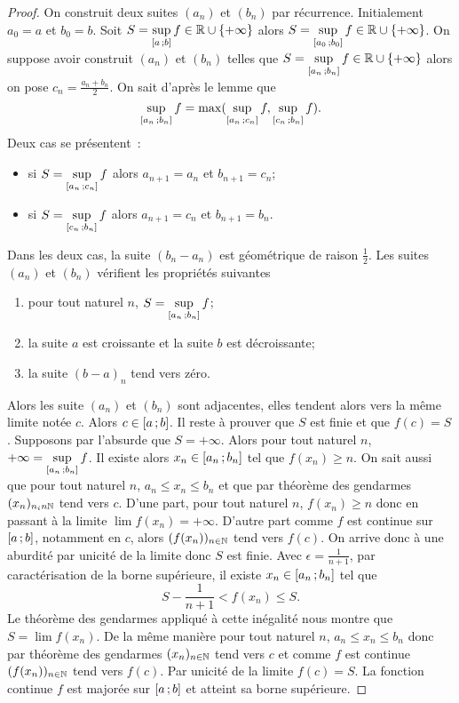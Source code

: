 \begin{proof}
  On construit deux suites $(a_n)$ et $(b_n)$ par récurrence. Initialement $a_0=a$ et $b_0=b$. Soit $S=\sup\limits_{\left[ a \, ;  b \right]}f \in \mathbb{R}\cup\{+\infty\}$ alors $S=\sup\limits_{\left[ a_0 \, ;  b_0 \right]}f \in \mathbb{R}\cup\{+\infty\}$. On suppose avoir construit $(a_n)$ et $(b_n)$ telles que $S=\sup\limits_{\left[ a_n \, ;  b_n \right]}f \in \mathbb{R}\cup\{+\infty\}$ alors on pose $c_n=\frac{a_n+b_n}{2}$. On sait d'après le lemme que 
  \begin{equation}
    \sup\limits_{\left[ a_n \, ;  b_n \right]}f=\max(\sup\limits_{\left[ a_n \, ;  c_n \right]}f,\sup\limits_{\left[ c_n \, ;  b_n \right]}f).
  \end{equation}
  Deux cas se présentent~:
  \begin{itemize}
  \item si $S=\sup\limits_{\left[ a_n \, ;  c_n \right]}f$ alors $a_{n+1}=a_n$ et $b_{n+1}=c_n$;
  \item si $S=\sup\limits_{\left[ c_n \, ;  b_n \right]}f$ alors $a_{n+1}=c_n$ et $b_{n+1}=b_n$.
  \end{itemize}
  Dans les deux cas, la suite $(b_n-a_n)$ est géométrique de raison $\frac{1}{2}$. Les suites $(a_n)$ et $(b_n)$ vérifient les propriétés suivantes
  \begin{enumerate}
  \item pour tout naturel $n$, $S=\sup\limits_{\left[ a_n \, ;  b_n \right]}f$;
  \item la suite $a$ est croissante et la suite $b$ est décroissante;
  \item la suite $(b-a)_n$ tend vers zéro.
  \end{enumerate}
  Alors les suite $(a_n)$ et $(b_n)$ sont adjacentes, elles tendent alors vers la même limite notée $c$. Alors $c \in \left[ a \, ;  b \right]$. Il reste à prouver que $S$ est finie et que $f(c)=S$. Supposons par l'absurde que $S=+\infty$. Alors pour tout naturel $n$, $+\infty = \sup\limits_{\left[ a_n \, ;  b_n \right]}f$. Il existe alors $x_n \in \left[ a_n \, ;  b_n \right]$ tel que $f(x_n) \geq n$. On sait aussi que pour tout naturel $n$, $a_n \leq x_n \leq b_n$ et que par théorème des gendarmes $(x_n)_{n _in \mathbb{N}}$ tend vers $c$. D'une part, pour tout naturel $n$, $f(x_n) \geq n$ donc en passant à la limite $\lim f(x_n) = +\infty$. D'autre part comme $f$ est continue sur $\left[ a \, ;  b \right]$, notamment en $c$, alors $(f(x_n))_{n\in \mathbb{N}}$ tend vers $f(c)$. On arrive donc à une aburdité par unicité de la limite donc $S$ est finie. Avec $\epsilon=\frac{1}{n+1}$, par caractérisation de la borne supérieure, il existe $x_n \in \left[ a_n \, ;  b_n \right]$ tel que
  \begin{equation}
    S-\frac{1}{n+1} < f(x_n) \leq S.
  \end{equation}
  Le théorème des gendarmes appliqué à cette inégalité nous montre que $S=\lim f(x_n)$. De la même manière pour tout naturel $n$, $a_n \leq x_n \leq b_n$ donc par théorème des gendarmes $(x_n)_{n\in \mathbb{N}}$ tend vers $c$ et comme $f$ est continue $(f(x_n))_{n\in \mathbb{N}}$ tend vers $f(c)$. Par unicité de la limite $f(c)=S$. La fonction continue $f$ est majorée sur $\left[ a \, ;  b \right]$ et atteint sa borne supérieure.
\end{proof}

